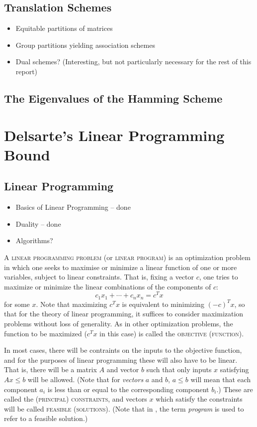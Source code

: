 \documentclass{report}
\begin{document}
  \section{Translation Schemes}
    \begin{itemize}
      \item Equitable partitions of matrices
      \item Group partitions yielding association schemes
      \item Dual schemes? (Interesting, but not particularly necessary for the
        rest of this report)
    \end{itemize}

  \section{The Eigenvalues of the Hamming Scheme}

\chapter{Delsarte's Linear Programming Bound}
  \section{Linear Programming}
    \begin{itemize}
      \item Basics of Linear Programming -- done
      \item Duality -- done
      \item Algorithms?
    \end{itemize}

    A \textsc{linear programming problem} (or \textsc{linear program})
    is an optimization problem in which one seeks to maximise or minimize
    a linear function of one or more variables, subject to linear constraints.
    That is, fixing a vector $c$, one tries to maximize or minimize
    the linear combinations of the components of $c$:
    $$
      c_1 x_1 + \cdots + c_n x_n = c^T x
    $$
    for some $x$.
    Note that maximizing $c^T x$ is equivalent to minimizing $(-c)^T x$,
    so that for the theory of linear programming,
    it suffices to consider maximization problems without loss of generality.
    As in other optimization problems,
    the function to be maximized ($c^T x$ in this case)
    is called the \textsc{objective (function)}.

    In most cases, there will be contraints on the inputs to the objective
    function, and for the purposes of linear programming these will also have
    to be linear.
    That is, there will be a matrix $A$ and vector $b$
    such that only inputs $x$ satisfying $Ax \leq b$ will be allowed.
    (Note that for \textit{vectors} $a$ and $b$,
    $a \leq b$ will mean that each component $a_i$
    is less than or equal to the corresponding component $b_i$.)
    These are called the \textsc{(principal) constraints},
    and vectors $x$ which satisfy the constraints will be called
    \textsc{feasible (solutions)}.
    (Note that in \cite{delsarte}, the term \textit{program}
    is used to refer to a feasible solution.)
\end{document}

